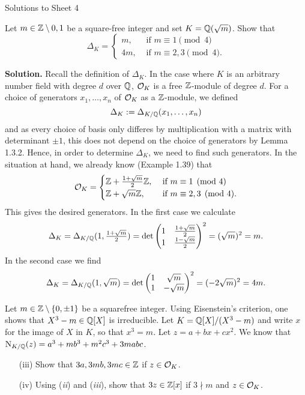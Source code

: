 \documentclass[a4paper,11pt]{article}
\begin{document}
\begin{center}
    \huge{Solutions to Sheet 4}
\end{center}

Let $m \in \mathbb{Z} \setminus{0,1}$ be a square-free integer and set $K = \mathbb{Q}(\sqrt m)$. 
Show that 
\begin{equation*}
    \Delta_K = \begin{cases}
        m, &\text{ if }m \equiv 1 \pmod 4\\
        4m, &\text{ if }m \equiv 2,3 \pmod 4.
    \end{cases}
\end{equation*}

\textbf{Solution.} Recall the definition of $\Delta_K$. In the case where 
$K$ is an arbitrary number field with degree $d$ over $\mathbb{Q}$, $\mathcal{O}_K$ is a free 
$\mathbb{Z}$-module of degree $d$. For a choice of generators $x_1, \dots, x_n$ of 
$\mathcal{O}_K$ as a $\mathbb{Z}$-module, we defined 
$$\Delta_K := \Delta_{K/\mathbb{Q}}(x_1, \dots, x_n)$$
and as every choice of basis only differes by multiplication with a matrix with 
determinant $\pm 1$, this does not depend on the choice of generators by Lemma 1.3.2.
Hence, in order to determine $\Delta_K$, we need to find such generators. In the
situation at hand, we already know (Example 1.39) that
\begin{equation*}
    \mathcal{O}_K = \begin{cases}
        \mathbb{Z} + \frac{1 + \sqrt m}2 \mathbb{Z} ,&\text{ if } m \equiv 1 \pmod 4 \\
        \mathbb{Z} + \sqrt m \mathbb{Z}, &\text{ if } m \equiv 2,3 \pmod 4.
    \end{cases}
\end{equation*}
This gives the desired generators. In the first case we calculate 
\begin{equation*}
    \Delta_K = \Delta_{K/\mathbb{Q}}(1, \tfrac{1 + \sqrt m}2) = 
    \det \begin{pmatrix} 1 & \tfrac{1 + \sqrt m}2\\ 1 & \tfrac{1 - \sqrt m}2 \end{pmatrix}^2
    = (\sqrt m)^2 = m.
\end{equation*}
In the second case we find 
\begin{equation*}
    \Delta_K = \Delta_{K/\mathbb{Q}}(1, \sqrt m) = 
    \det \begin{pmatrix} 1 & \sqrt m\\ 1 & -\sqrt m \end{pmatrix}^2
    = (-2\sqrt m)^2 = 4m.
\end{equation*}


Let $m \in \mathbb{Z} \setminus\{0, \pm 1\}$ be a squarefree integer. Using Eisenstein's
criterion, one shows that $X^3 - m \in \mathbb{Q}[X]$ is irreducible. Let $K =
\mathbb{Q}[X]/(X^3 -m)$ and write $x$ for the image of $X$ in $K$, so that $x^3 = m$.
Let $z = a + bx + cx^2$. We know that $\operatorname{N}_{K/\mathbb{Q}}(z) = a^3 + mb^3 + m^2 c^3 +
3mabc$.
\begin{itemize}[wide, labelindent=0pt]
    \item[(iii)] Show that $3a, 3mb, 3mc \in \mathbb{Z}$ if $z \in \mathcal{O}_K$. 
    \item[(iv)] Using (\textit{ii}) and (\textit{iii}), show that 
        $3z \in \mathbb{Z}[x]$ if $3 \nmid m$ and $z \in \mathcal{O}_K$. 
\end{itemize}
\end{document}
